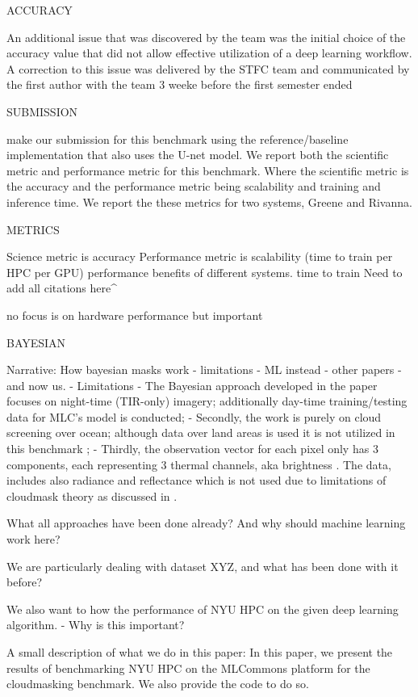 ACCURACY


An additional issue that was discovered by the team was the initial choice of the accuracy value that did not allow effective utilization of a deep learning workflow. A correction to this issue was delivered by the STFC team and communicated by the first author with the team 3 weeke before the first semester ended 

SUBMISSION

make our submission for this benchmark using the reference/baseline implementation that also uses the U-net model. We report both the scientific metric and performance metric for this benchmark. Where the scientific metric is the accuracy and the performance metric being scalability and training and inference time. We report the these metrics for two systems, Greene and Rivanna.


METRICS

Science metric is accuracy 
Performance metric is scalability (time to train per HPC per GPU) %
performance benefits of different systems.%
time to train %
Need to add all citations here^

no focus is on hardware performance but important

BAYESIAN

    
Narrative: How bayesian masks work - limitations - ML instead - other papers - and now us.
- Limitations
    - The Bayesian approach developed in the paper focuses on night-time (TIR-only) imagery; additionally day-time training/testing data for MLC's model is conducted;
    - Secondly, the work is purely on cloud screening over ocean; although  data over land areas is used it is not utilized in this benchmark ;
    - Thirdly, the observation vector for each pixel only has 3 components, each representing 3 thermal channels, aka brightness . The data, includes also radiance and reflectance which is not used due to limitations of cloudmask theory as discussed in \cite{???}.

What all approaches have been done already? And why should machine learning work here?

We are particularly dealing with dataset XYZ, and what has been done with it before?

We also want to how the performance of NYU HPC on the given deep learning algorithm. - Why is this important?

A small description of what we do in this paper:
In this paper, we present the results of benchmarking NYU HPC on the MLCommons platform for the cloudmasking benchmark. We also provide the code to do so.
